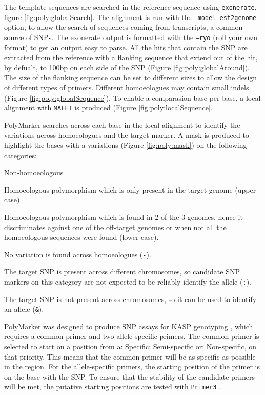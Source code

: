 The template sequences are searched in the reference sequence using \texttt{exonerate}\citep{Slater2005}, figure \ref{fig:poly:globalSearch}. 
The alignment is run with the \texttt{--model est2genome} option, to allow the search of sequences coming from transcripts, a common source of SNPs\citep{Allen2011}. 
The exonerate output is formatted with the \texttt{--ryo} (roll your own format) to get an output easy to parse. 
All the hits that contain the SNP are extracted from the reference with a flanking sequence that extend out of the hit, by defualt, to 100bp on each side of the SNP (Figure \ref{fig:poly:globalAround}).
The size of the flanking sequence can be set to different sizes to allow the design of different types of primers. 
Different homoeologues may contain small indels (Figure \ref{fig:poly:globalSequence}). 
To enable a comparasion base-per-base, a local alignment with \texttt{MAFFT} \citep{Katoh2013} is produced (Figure \ref{fig:poly:localSequence}. 

PolyMarker searches across each base in the local alignment to identify the variations across homoeologues and the target marker.
A mask is produced to highlight the bases with a variations (Figure \ref{fig:poly:mask}) on the following categories:
\begin{labeling}{Non-homoeologous}
\item [Specific] Homoeologous polymorphism which is only present in the target genome (upper case).
\item [Semi-specific] Homoeologous polymorphism which is found in 2 of the 3 genomes, hence it discriminates against one of the off-target genomes or when not all the homoeologous sequences were found (lower case).
\item [Non-specific] No variation is found across homoeologues (\texttt{-}).
\item [Homoeologous] The target SNP is present across different chromosomes, so candidate SNP markers on this category are not expected to be reliably identify the allele (\texttt{:}).
\item [Non-homoeologous] The target SNP is not present across chromosomes, so it can be used to identify an allele (\texttt{\&}).
\end{labeling} 

PolyMarker was designed to produce SNP assays for KASP genotyping \citep{LGC}, which requires a common primer and two allele-specific primers. 
The common primer is selected to start on a position from a: Specific; Semi-specific or; Non-specific, on that priority. 
This means that the common primer will be as specific as possible in the region. 
For the allele-specific primers, the starting position of the primer is on the base with the SNP. 
To ensure that the stability of the candidate primers will be met, the putative starting positions are tested with \texttt{Primer3} \citep{Rozen}. 

